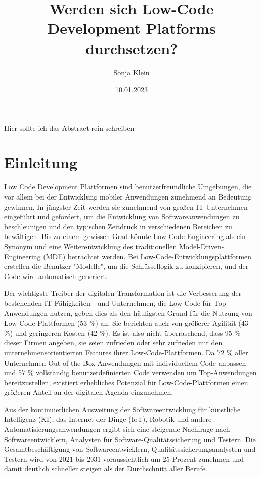 \documentclass{article}
\title{Werden sich Low-Code Development Platforms durchsetzen?}
\author{Sonja Klein}
\date{10.01.2023}
\begin{document}
	
	Hier sollte ich das Abstract rein schreiben
	
	\maketitle	
	\tableofcontents	
	\newpage
	
	\section{Einleitung}
	
	Low Code Development Plattformen sind benutzerfreundliche Umgebungen, die vor allem bei der Entwicklung mobiler Anwendungen zunehmend an Bedeutung gewinnen. In jüngster Zeit werden sie zunehmend von großen IT-Unternehmen eingeführt und gefördert, um die Entwicklung von Softwareanwendungen zu beschleunigen und den typischen Zeitdruck in verschiedenen Bereichen zu bewältigen. Bis zu einem gewissen Grad könnte Low-Code-Engineering als ein Synonym und eine Weiterentwicklung des traditionellen Model-Driven-Engineering (MDE) betrachtet werden.
	Bei Low-Code-Entwicklungsplattformen erstellen die Benutzer "Modelle", um die Schlüssellogik zu konzipieren, und der Code wird automatisch generiert.
	\cite{Wang.2021}
	
	Der wichtigste Treiber der digitalen Transformation ist die Verbesserung der bestehenden IT-Fähigkeiten - und Unternehmen, die Low-Code für Top-Anwendungen nutzen, geben dies als den häufigsten Grund für die Nutzung von Low-Code-Plattformen (53 \%) an.
	Sie berichten auch von größerer Agilität (43 \%) und geringeren Kosten (42 \%). Es ist also nicht überraschend, dass 95 \% dieser Firmen angeben, sie seien zufrieden oder sehr zufrieden mit den unternehmensorientierten Features ihrer Low-Code-Plattformen. 
	Da 72 \% aller Unternehmen Out-of-the-Box-Anwendungen mit individuellem Code anpassen und 57 \% vollständig benutzerdefinierten Code verwenden um Top-Anwendungen bereitzustellen, existiert erhebliches Potenzial für Low-Code-Plattformen einen größeren Anteil an der digitalen Agenda einzunehmen. \cite{EmmaVanPelt.2019}
	
	Aus der kontinuierlichen Ausweitung der Softwareentwicklung für künstliche Intelligenz (KI), das Internet der Dinge (IoT), Robotik und andere Automatisierungsanwendungen ergibt sich eine steigende Nachfrage nach Softwareentwicklern, Analysten für Software-Qualitätssicherung und Testern.
	Die Gesamtbeschäftigung von Softwareentwicklern, Qualitätssicherungsanalysten und Testern wird von 2021 bis 2031 voraussichtlich um 25 Prozent zunehmen und damit deutlich schneller steigen als der Durchschnitt aller Berufe.
	
\end{document}
